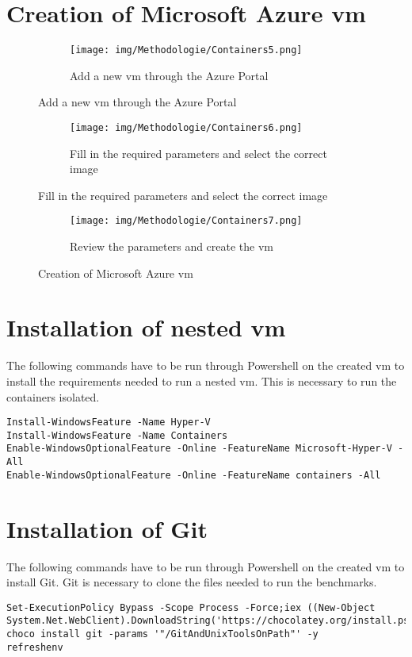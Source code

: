 \label{Containers_Azure}
\section{Creation of Microsoft Azure \acrshort{vm}}
\begin{figure}[h]
	\begin{subfigure}{\textwidth}
		\captionsetup{width=0.9\linewidth}
		\texttt{[image: img/Methodologie/Containers5.png]} 
		\centering
		\caption{Add a new \acrshort{vm} through the Azure Portal}
		\label{fig:Container_VM_0}
	\end{subfigure}
\end{figure}
\begin{figure}[h]\ContinuedFloat
	\begin{subfigure}{\textwidth}
		\captionsetup{width=0.9\linewidth}
		\texttt{[image: img/Methodologie/Containers6.png]}
		\centering
		\caption{Fill in the required parameters and select the correct image}
		\label{fig:Container_VM_1}
	\end{subfigure}
\end{figure}
\begin{figure}[h]\ContinuedFloat
	\begin{subfigure}{\textwidth}
		\captionsetup{width=0.9\linewidth}
		\texttt{[image: img/Methodologie/Containers7.png]}
		\centering
		\caption{Review the parameters and create the \acrshort{vm}}
		\label{fig:Container_VM_2}
	\end{subfigure}
	\caption{Creation of Microsoft Azure \acrshort{vm}}
	\label{fig:Container_VM}
\end{figure}
\clearpage
\section{Installation of nested \acrshort{vm}}
The following commands have to be run through Powershell on the created \acrshort{vm} to install the requirements needed to run a nested \acrshort{vm}. This is necessary to run the containers isolated.
\begin{lstlisting}[breaklines]
Install-WindowsFeature -Name Hyper-V
Install-WindowsFeature -Name Containers
Enable-WindowsOptionalFeature -Online -FeatureName Microsoft-Hyper-V -All
Enable-WindowsOptionalFeature -Online -FeatureName containers -All
\end{lstlisting}
\section{Installation of Git}
The following commands have to be run through Powershell on the created \acrshort{vm} to install Git. Git is necessary to clone the files needed to run the benchmarks.
\begin{lstlisting}[breaklines]
Set-ExecutionPolicy Bypass -Scope Process -Force;iex ((New-Object System.Net.WebClient).DownloadString('https://chocolatey.org/install.ps1'))
choco install git -params '"/GitAndUnixToolsOnPath"' -y
refreshenv
\end{lstlisting}
